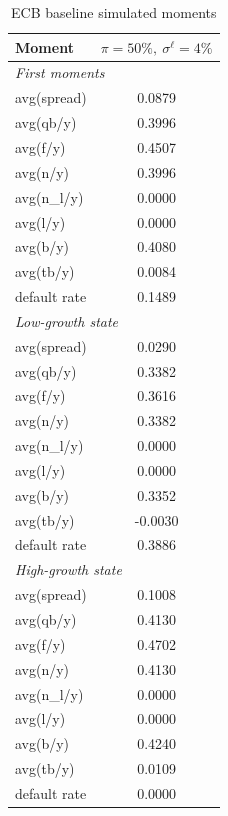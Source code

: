 \begin{table}[!htbp]
\centering
\caption{ECB baseline simulated moments}
\begin{tabular}{lc}
\toprule
Moment & $\pi=50\%,\ \sigma^\ell=4\%$ \\
\midrule
\multicolumn{2}{l}{\textit{First moments}} \\
avg(spread) & 0.0879 \\
avg(qb/y) & 0.3996 \\
avg(f/y) & 0.4507 \\
avg(n/y) & 0.3996 \\
avg(n_l/y) & 0.0000 \\
avg(l/y) & 0.0000 \\
avg(b/y) & 0.4080 \\
avg(tb/y) & 0.0084 \\
default rate & 0.1489 \\
\midrule
\multicolumn{2}{l}{\textit{Low-growth state}} \\
avg(spread) & 0.0290 \\
avg(qb/y) & 0.3382 \\
avg(f/y) & 0.3616 \\
avg(n/y) & 0.3382 \\
avg(n_l/y) & 0.0000 \\
avg(l/y) & 0.0000 \\
avg(b/y) & 0.3352 \\
avg(tb/y) & -0.0030 \\
default rate & 0.3886 \\
\midrule
\multicolumn{2}{l}{\textit{High-growth state}} \\
avg(spread) & 0.1008 \\
avg(qb/y) & 0.4130 \\
avg(f/y) & 0.4702 \\
avg(n/y) & 0.4130 \\
avg(n_l/y) & 0.0000 \\
avg(l/y) & 0.0000 \\
avg(b/y) & 0.4240 \\
avg(tb/y) & 0.0109 \\
default rate & 0.0000 \\
\bottomrule
\end{tabular}
\end{table}
